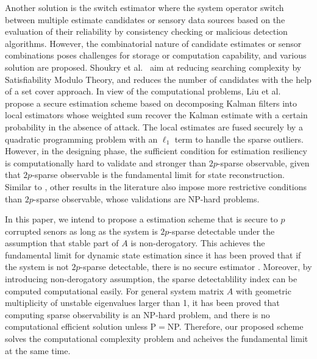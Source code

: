 \documentclass[12pt]{article}  %
\begin{document}
Another solution is the switch estimator\cite{HespanhaACC2015}\cite{Shoukry2017}\cite{yorie}\cite{yangguanghong2018tac}\cite{luTAC2019} where the system operator switch between multiple estimate candidates\cite{HespanhaACC2015}\cite{yorie} or sensory data sources\cite{Shoukry2017}\cite{yangguanghong2018tac}\cite{luTAC2019} based on the evaluation of their reliability by consistency checking or malicious detection algorithms. However, the combinatorial nature of candidate estimates or sensor combinations poses challenges for storage or computation capability, and various solution are proposed. Shoukry et al.~\cite{Shoukry2017} aim at reducing searching complexity by Satisfiability Modulo Theory, and \cite{luTAC2019} reduces the number of candidates with the help of a set cover approach.
In view of the computational problems, Liu et al. \cite{liuxinghua-TAC2020} propose a secure estimation scheme based on decomposing Kalman filters into local estimators whose weighted sum recover the Kalman estimate with a certain probability in the absence of attack. The local estimates are fused securely by a quadratic programming problem with an $\ell_1$ term to handle the sparse outliers. However, in the designing phase, the sufficient condition for estimation resiliency is computationally hard to validate and stronger than $2p$-sparse observable, given that $2p$-sparse observable is the fundamental limit \cite{ShoukryTAC2016} for state reconstruction.
Similar to \cite{liuxinghua-TAC2020}, other results in the literature\cite{FawziTAC2014}\cite{sandberg_TAC2014} also impose more restrictive conditions than $2p$-sparse observable, whose validations are NP-hard problems.

In this paper, we intend to propose a estimation scheme that is secure to $p$ corrupted senors as long as the system is $2p$-sparse detectable under the assumption that stable part of $A$ is non-derogatory. This achieves the fundamental limit for dynamic state estimation since it has been proved that if the system is not $2p$-sparse detectable, there is no secure estimator \cite{yorie}. Moreover, by introducing non-derogatory assumption, the sparse detectablility index can be computed computational easily. For general system matrix $A$ with geometric multiplicity of unstable eigenvalues larger than 1, it has been proved that computing sparse observability is an NP-hard problem\cite{mao2021computational}, and there is no computational efficient solution unless P$=$NP. 
Therefore, our proposed scheme solves the computational complexity problem and acheives the fundamental limit at the same time.
\end{document}
